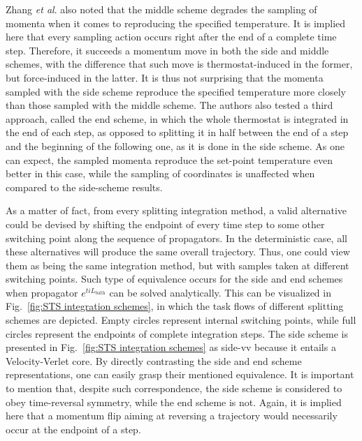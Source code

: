 \documentclass[
    journal=jctcce,
    layout=twocolumn
]{achemso}
\newcommand{\Liu}{i\!L}
\begin{document}
Zhang \textit{et al}. \cite{Zhang_2017} also noted that the middle scheme degrades the sampling of momenta when it comes to reproducing the specified temperature.
It is implied here that every sampling action occurs right after the end of a complete time step.
Therefore, it succeeds a momentum move in both the side and middle schemes, with the difference that such move is thermostat-induced in the former, but force-induced in the latter.
It is thus not surprising that the momenta sampled with the side scheme reproduce the specified temperature more closely than those sampled with the middle scheme.
The authors also tested a third approach, called the end scheme, in which the whole thermostat is integrated in the end of each step, as opposed to splitting it in half between the end of a step and the beginning of the following one, as it is done in the side scheme.
As one can expect, the sampled momenta reproduce the set-point temperature even better in this case, while the sampling of coordinates is unaffected when compared to the side-scheme results.

As a matter of fact, from every splitting integration method, a valid alternative could be devised by shifting the endpoint of every time step to some other switching point along the sequence of propagators.
In the deterministic case, all these alternatives will produce the same overall trajectory.
Thus, one could view them as being the same integration method, but with samples taken at different switching points.
Such type of equivalence occurs for the side and end schemes when propagator $e^{t \Liu_\mathrm{bath}}$ can be solved analytically.
This can be visualized in Fig.~\ref{fig:STS integration schemes}, in which the task flows of different splitting schemes are depicted.
Empty circles represent internal switching points, while full circles represent the endpoints of complete integration steps.
The side scheme is presented in Fig.~\ref{fig:STS integration schemes} as side-vv because it entails a Velocity-Verlet core.
By directly contrasting the side and end scheme representations, one can easily grasp their mentioned equivalence.
It is important to mention that, despite such correspondence, the side scheme is considered to obey time-reversal symmetry, while the end scheme is not.
Again, it is implied here that a momentum flip aiming at reversing a trajectory would necessarily occur at the endpoint of a step.

\begin{figure*}
	
	\caption{Integration schemes.
	In all schemes, force computation is required once per time step.}
	\label{fig:STS integration schemes}
\end{figure*}
\end{document}
